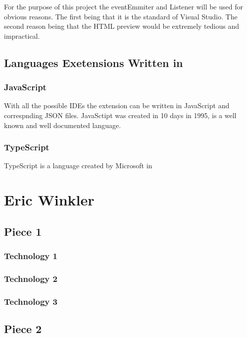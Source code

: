 \documentclass[letterpaper,10pt,titlepage,draftclsnofoot,onecolumn,onesided] {IEEEtran}
\begin{document}
For the purpose of this project the eventEmmiter and Listener will be used for obvious reasons. 
The first being that it is the standard of Visual Studio. 
The second reason being that the HTML preview would be extremely tedious and impractical.

\subsection{Languages Exetensions Written in}
\subsubsection{JavaScript}
With all the possible IDEs the extension can be written in JavaScript and correspnding JSON files. 
JavaSctipt was created in 10 days in 1995, is a well known and well documented language. \cite{JavaScript History}
\subsubsection{TypeScript}
TypeScript is a language created by Microsoft in \cite{TypeScript}


\section{Eric Winkler}
\subsection{Piece 1}
\subsubsection{Technology 1}
\subsubsection{Technology 2}
\subsubsection{Technology 3}

\subsection{Piece 2}
\end{document}
